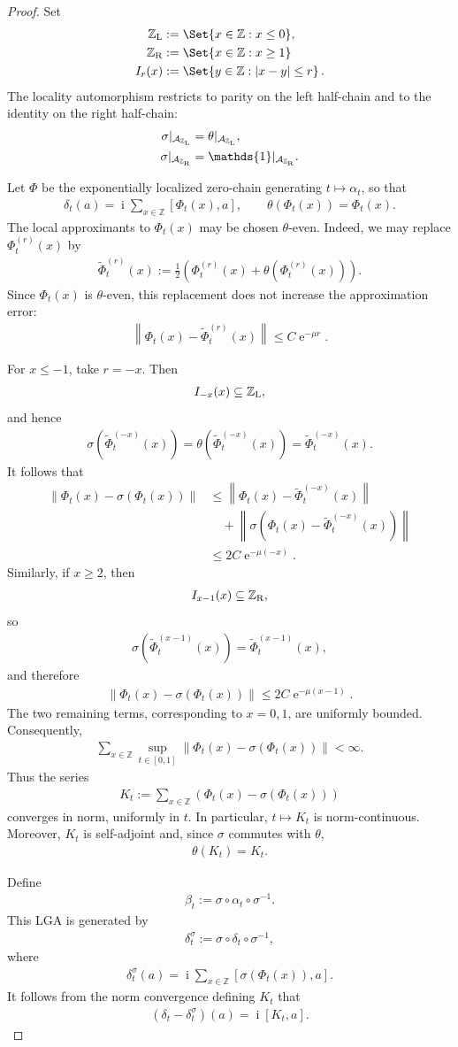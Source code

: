 \documentclass[a4paper,10pt]{article}
\numberwithin{equation}{section}
\theoremstyle{plain}
\theoremstyle{plain}
\theoremstyle{plain}
\theoremstyle{plain}
\theoremstyle{plain}
\theoremstyle{remark}
\theoremstyle{definition}
\newcommand{\ee}{\operatorname{e}}
\newcommand{\ii}{\operatorname{i}}
\newcommand{\ZZ}{\mathbb{Z}}
\newcommand{\calA}{\mathcal{A}}
\newcommand\norm[1]{\left\lVert#1\right\rVert}
\newcommand{\Id}{\mathds{1}}
\newcommand{\eq}[1]{\begin{align*}#1\end{align*}}
\newcommand{\br}[1]{\left(#1\right)}
\begin{document}
\begin{proof}
Set
\eq{
\ZZ_{\rm L}
&:=
\Set{x\in\ZZ:x\leq0},\\
\ZZ_{\rm R}
&:=
\Set{x\in\ZZ:x\geq1}\\
I_r(x) &:= \Set{y\in\ZZ : |x-y|\leq r}\,.
}
The locality automorphism restricts to parity on the left half-chain and
to the identity on the right half-chain:
\eq{
\sigma|_{\calA_{\ZZ_{\rm L}}}
&=
\theta|_{\calA_{\ZZ_{\rm L}}},\\
\sigma|_{\calA_{\ZZ_{\rm R}}}
&=
\Id|_{\calA_{\ZZ_{\rm R}}}.
}

Let $\Phi$ be the exponentially localized zero-chain generating
$t\mapsto\alpha_t$, so that
\eq{
\delta_t(a)
=
\ii\sum_{x\in\ZZ}
[\Phi_t(x),a],
\qquad
\theta(\Phi_t(x))
=
\Phi_t(x).
}
The local approximants to $\Phi_t(x)$ may be chosen $\theta$-even. Indeed,
we may replace $\Phi_t^{(r)}(x)$ by
\eq{
\widetilde{\Phi}_t^{(r)}(x)
:=
\frac{1}{2}
\br{
\Phi_t^{(r)}(x)
+
\theta\br{\Phi_t^{(r)}(x)}
}.
}
Since $\Phi_t(x)$ is $\theta$-even, this replacement does not increase the
approximation error:
\eq{
\norm{
\Phi_t(x)
-
\widetilde{\Phi}_t^{(r)}(x)
}
\leq
C\ee^{-\mu r}.
}

For $x\leq-1$, take $r=-x$. Then
\eq{
I_{-x}(x)
\subseteq
\ZZ_{\rm L},
}
and hence
\eq{
\sigma\br{
\widetilde{\Phi}_t^{(-x)}(x)
}
=
\theta\br{
\widetilde{\Phi}_t^{(-x)}(x)
}
=
\widetilde{\Phi}_t^{(-x)}(x).
}
It follows that
\eq{
\norm{
\Phi_t(x)-\sigma\br{\Phi_t(x)}
}
&\leq
\norm{
\Phi_t(x)-\widetilde{\Phi}_t^{(-x)}(x)
}\\
&\quad+
\norm{
\sigma\br{
\Phi_t(x)-\widetilde{\Phi}_t^{(-x)}(x)
}
}\\
&\leq
2C\ee^{-\mu(-x)}.
}
Similarly, if $x\geq2$, then
\eq{
I_{x-1}(x)
\subseteq
\ZZ_{\rm R},
}
so
\eq{
\sigma\br{
\widetilde{\Phi}_t^{(x-1)}(x)
}
=
\widetilde{\Phi}_t^{(x-1)}(x),
}
and therefore
\eq{
\norm{
\Phi_t(x)-\sigma\br{\Phi_t(x)}
}
\leq
2C\ee^{-\mu(x-1)}.
}
The two remaining terms, corresponding to $x=0,1$, are uniformly bounded.
Consequently,
\eq{
\sum_{x\in\ZZ}
\sup_{t\in[0,1]}
\norm{
\Phi_t(x)-\sigma\br{\Phi_t(x)}
}
<
\infty.
}
Thus the series
\eq{
K_t
:=
\sum_{x\in\ZZ}
\br{
\Phi_t(x)-\sigma\br{\Phi_t(x)}
}
}
converges in norm, uniformly in $t$. In particular,
$t\mapsto K_t$ is norm-continuous. Moreover, $K_t$ is self-adjoint and,
since $\sigma$ commutes with $\theta$,
\eq{
\theta(K_t)
=
K_t.
}

Define
\eq{
\beta_t
:=
\sigma\circ\alpha_t\circ\sigma^{-1}.
}
This LGA is generated by
\eq{
\delta_t^\sigma
:=
\sigma\circ\delta_t\circ\sigma^{-1},
}
where
\eq{
\delta_t^\sigma(a)
=
\ii\sum_{x\in\ZZ}
\left[
\sigma\br{\Phi_t(x)},
a
\right].
}
It follows from the norm convergence defining $K_t$ that
\eq{
\br{
\delta_t-\delta_t^\sigma
}(a)
=
\ii[K_t,a].
}


\end{proof}
\end{document}
